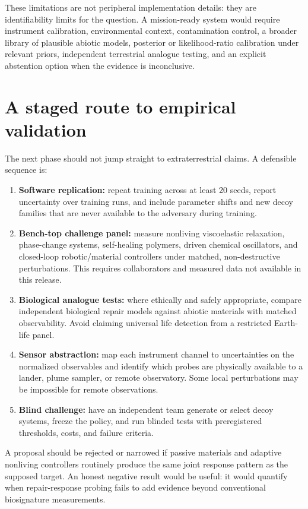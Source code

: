 \documentclass[11pt]{article}
\begin{document}
These limitations are not peripheral implementation details: they are identifiability limits for the question. A mission-ready system would require instrument calibration, environmental context, contamination control, a broader library of plausible abiotic models, posterior or likelihood-ratio calibration under relevant priors, independent terrestrial analogue testing, and an explicit abstention option when the evidence is inconclusive.

\section{A staged route to empirical validation}
The next phase should not jump straight to extraterrestrial claims. A defensible sequence is:
\begin{enumerate}
\item \textbf{Software replication:} repeat training across at least 20 seeds, report uncertainty over training runs, and include parameter shifts and new decoy families that are never available to the adversary during training.
\item \textbf{Bench-top challenge panel:} measure nonliving viscoelastic relaxation, phase-change systems, self-healing polymers, driven chemical oscillators, and closed-loop robotic/material controllers under matched, non-destructive perturbations. This requires collaborators and measured data not available in this release.
\item \textbf{Biological analogue tests:} where ethically and safely appropriate, compare independent biological repair models against abiotic materials with matched observability. Avoid claiming universal life detection from a restricted Earth-life panel.
\item \textbf{Sensor abstraction:} map each instrument channel to uncertainties on the normalized observables and identify which probes are physically available to a lander, plume sampler, or remote observatory. Some local perturbations may be impossible for remote observations.
\item \textbf{Blind challenge:} have an independent team generate or select decoy systems, freeze the policy, and run blinded tests with preregistered thresholds, costs, and failure criteria.
\end{enumerate}

A proposal should be rejected or narrowed if passive materials and adaptive nonliving controllers routinely produce the same joint response pattern as the supposed target. An honest negative result would be useful: it would quantify when repair-response probing fails to add evidence beyond conventional biosignature measurements.
\end{document}
